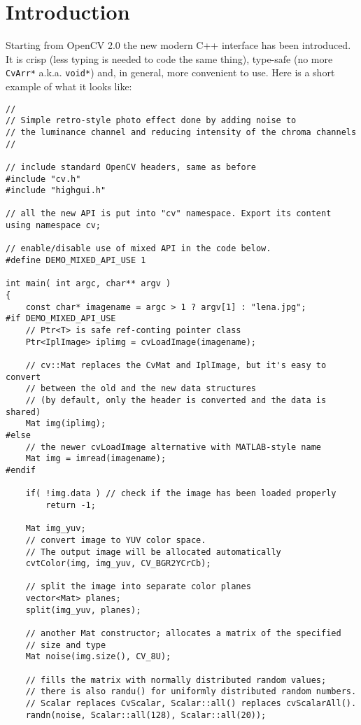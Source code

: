 \ifCpp
\chapter{Introduction}

Starting from OpenCV 2.0 the new modern C++ interface has been introduced.
It is crisp (less typing is needed to code the same thing), type-safe (no more \texttt{CvArr*} a.k.a. \texttt{void*})
and, in general, more convenient to use. Here is a short example of what it looks like:

\begin{lstlisting}
//
// Simple retro-style photo effect done by adding noise to
// the luminance channel and reducing intensity of the chroma channels
//

// include standard OpenCV headers, same as before
#include "cv.h"
#include "highgui.h"

// all the new API is put into "cv" namespace. Export its content
using namespace cv;

// enable/disable use of mixed API in the code below.
#define DEMO_MIXED_API_USE 1

int main( int argc, char** argv )
{
    const char* imagename = argc > 1 ? argv[1] : "lena.jpg";
#if DEMO_MIXED_API_USE
    // Ptr<T> is safe ref-conting pointer class
    Ptr<IplImage> iplimg = cvLoadImage(imagename);
    
    // cv::Mat replaces the CvMat and IplImage, but it's easy to convert
    // between the old and the new data structures
    // (by default, only the header is converted and the data is shared)
    Mat img(iplimg); 
#else
    // the newer cvLoadImage alternative with MATLAB-style name
    Mat img = imread(imagename);
#endif

    if( !img.data ) // check if the image has been loaded properly
        return -1;

    Mat img_yuv;
    // convert image to YUV color space.
    // The output image will be allocated automatically
    cvtColor(img, img_yuv, CV_BGR2YCrCb); 

    // split the image into separate color planes
    vector<Mat> planes;
    split(img_yuv, planes);

    // another Mat constructor; allocates a matrix of the specified
	// size and type
    Mat noise(img.size(), CV_8U);
    
    // fills the matrix with normally distributed random values;
    // there is also randu() for uniformly distributed random numbers. 
    // Scalar replaces CvScalar, Scalar::all() replaces cvScalarAll().
    randn(noise, Scalar::all(128), Scalar::all(20));
                                                     

\end{lstlisting}
